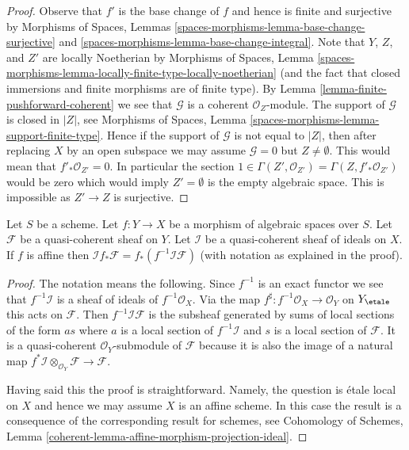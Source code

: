 \begin{proof}
Observe that $f'$ is the base change of $f$ and hence is finite
and surjective by Morphisms of Spaces, Lemmas
\ref{spaces-morphisms-lemma-base-change-surjective} and
\ref{spaces-morphisms-lemma-base-change-integral}.
Note that $Y$, $Z$, and $Z'$ are locally Noetherian by
Morphisms of Spaces, Lemma
\ref{spaces-morphisms-lemma-locally-finite-type-locally-noetherian}
(and the fact that closed immersions and finite morphisms
are of finite type). By Lemma \ref{lemma-finite-pushforward-coherent}
we see that $\mathcal{G}$ is a coherent $\mathcal{O}_Z$-module.
The support of $\mathcal{G}$ is closed in $|Z|$, see
Morphisms of Spaces, Lemma
\ref{spaces-morphisms-lemma-support-finite-type}.
Hence if the support of $\mathcal{G}$ is not equal to $|Z|$,
then after replacing $X$ by an open subspace we may assume
$\mathcal{G} = 0$ but $Z \not = \emptyset$.
This would mean that $f'_*\mathcal{O}_{Z'} = 0$. In particular the section
$1 \in \Gamma(Z', \mathcal{O}_{Z'}) = \Gamma(Z, f'_*\mathcal{O}_{Z'})$
would be zero which would imply $Z' = \emptyset$ is the empty
algebraic space. This is impossible as $Z' \to Z$ is surjective.
\end{proof}

\begin{lemma}
\label{lemma-affine-morphism-projection-ideal}
Let $S$ be a scheme. Let $f : Y \to X$ be a morphism of algebraic spaces
over $S$. Let $\mathcal{F}$ be a quasi-coherent sheaf on $Y$.
Let $\mathcal{I}$ be a quasi-coherent sheaf of ideals on $X$.
If $f$ is affine then
$\mathcal{I}f_*\mathcal{F} = f_*(f^{-1}\mathcal{I}\mathcal{F})$
(with notation as explained in the proof).
\end{lemma}

\begin{proof}
The notation means the following. Since $f^{-1}$ is an exact functor
we see that $f^{-1}\mathcal{I}$ is a sheaf
of ideals of $f^{-1}\mathcal{O}_X$. Via the map
$f^\sharp : f^{-1}\mathcal{O}_X \to \mathcal{O}_Y$
on $Y_\etale$ this acts on $\mathcal{F}$.
Then $f^{-1}\mathcal{I}\mathcal{F}$ is the subsheaf
generated by sums of local sections of the form $as$ where $a$
is a local section of $f^{-1}\mathcal{I}$ and $s$ is a local section
of $\mathcal{F}$. It is a quasi-coherent $\mathcal{O}_Y$-submodule
of $\mathcal{F}$ because it is also the image of a natural map
$f^*\mathcal{I} \otimes_{\mathcal{O}_Y} \mathcal{F} \to \mathcal{F}$.

\medskip\noindent
Having said this the proof is straightforward. Namely, the question is
\'etale local on $X$ and hence we may assume $X$ is an affine scheme.
In this case the result is a consequence of the corresponding result
for schemes, see Cohomology of Schemes, Lemma
\ref{coherent-lemma-affine-morphism-projection-ideal}.
\end{proof}

